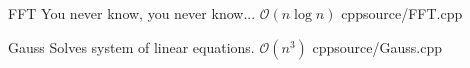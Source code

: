 \documentclass[landscape, 10pt, a4paper, oneside, twocolumn]{extarticle}
\begin{document}
\Algorithm
{FFT}
{You never know, you never know...}
{$\mathcal{O}(n \log n)$}
{cpp}{source/FFT.cpp}

\Algorithm
{Gauss}
{Solves system of linear equations.}
{$\mathcal{O}(n^{3})$}
{cpp}{source/Gauss.cpp}




\end{document}
